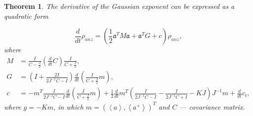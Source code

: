 \documentclass[12pt]{article}
\newtheorem{theorem}{Theorem}
\theoremstyle{definition}
\newcommand\bra{\left<}
\newcommand\ket{\right>}
\newcommand{\braket}[1]{\bra#1\ket}
\newcommand{\mf}[1]{\mathfrak{#1}}
\begin{document}
	\begin{theorem}
		\label{th:DerOfGaus}
		The derivative of the Gaussian exponent can be expressed as a quadratic form
		
		\begin{equation*}
			\frac{d}{dt}\rho_{anz} = (\frac{1}{2}\mf{a}^TM\mf{a} + \mf{a}^TG + c)\rho_{anz},
		\end{equation*}
		where
		\begin{align*}
			M &= \frac{I}{C - \frac{J}{2}}\left(\frac{d}{dt}C\right)\frac{I}{C + \frac{J}{2}},\\
			G &= \left(  I + \frac{2I}{2J^{-1}C - I}  \right)\frac{d}{dt}\left(\frac{I}{C + \frac{J}{2}}m\right),\\
			c &=-m^T\frac{I}{2J^{-1}C -  I}\frac{d}{dt}\left(\frac{I}{C + \frac{J}{2}}m\right) + \frac{1}{2}\frac{d}{dt}m^T\left( \frac{I}{2J^{-1}C - I} - \frac{I}{2J^{-1}C + I} - KJ \right)J^{-1}m + \frac{d}{dt}c_t,
		\end{align*}
		where $g = -Km$, in which $m = (\braket{a} , \braket{a^+})^T$ and $C$ --- covariance matrix.
	\end{theorem}
\end{document}
